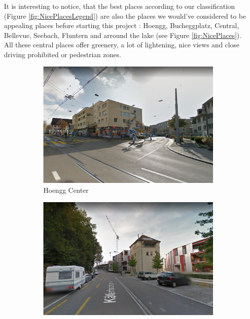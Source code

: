 \documentclass[letterpaper]{article}
\begin{document}
It is interesting to notice, that the best places according to our classification (Figure \ref{fig:NicePlacesLegend})
are also the places we would've considered to be appealing places before starting this project : 
Hoengg, Bucheggplatz, Central, Bellevue, Seebach, Fluntern and arround the lake (see Figure \ref{fig:NicePlaces}). All these central places
offer greenery, a lot of lightening, nice views and close driving prohibited or pedestrian
zones.

\begin{figure}[H]
    \centering
    \begin{subfigure}[t]{.45\columnwidth}
        \centering
        \includegraphics[width=\linewidth]{images/good/hoengg.png}
        \caption[width=.9\linewidth]{Hoengg Center}
    \end{subfigure}\hspace{0.05\columnwidth}
    \begin{subfigure}[t]{.45\columnwidth}
        \centering
        \includegraphics[width=\linewidth]{images/good/buchegg.png}

\end{subfigure}
\end{figure}
\end{document}
